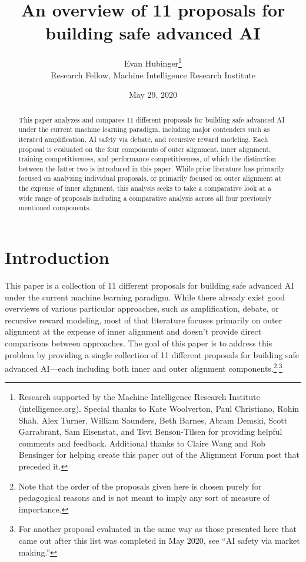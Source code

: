 \documentclass[
  onecolumn,
  natbib,
]{miri-tech-article}
\begin{document}
\title{An overview of 11 proposals for building safe advanced AI}
\author{Evan Hubinger\thanks{Research supported by the Machine Intelligence Research Institute (intelligence.org). Special thanks to Kate Woolverton, Paul Christiano, Rohin Shah, Alex Turner, William Saunders, Beth Barnes, Abram Demski, Scott Garrabrant, Sam Eisenstat, and Tsvi Benson-Tilsen for providing helpful comments and feedback. Additional thanks to Claire Wang and Rob Bensinger for helping create this paper out of the Alignment Forum post that preceded it.\cite{post}} \\ Research Fellow, Machine Intelligence Research Institute}

\date{May 29, 2020}

\maketitle

\begin{abstract}
This paper analyzes and compares 11 different proposals for building safe advanced AI under the current machine learning paradigm, including major contenders such as iterated amplification, AI safety via debate, and recursive reward modeling. Each proposal is evaluated on the four components of outer alignment, inner alignment, training competitiveness, and performance competitiveness, of which the distinction between the latter two is introduced in this paper. While prior literature has primarily focused on analyzing individual proposals, or primarily focused on outer alignment at the expense of inner alignment, this analysis seeks to take a comparative look at a wide range of proposals including a comparative analysis across all four previously mentioned components.
\end{abstract}

\tableofcontents

\section{Introduction}
\label{sec:0}

This paper is a collection of 11 different proposals for building safe advanced AI under the current machine learning paradigm. While there already exist good overviews of various particular approaches, such as amplification\cite{amplification}, debate\cite{debate}, or recursive reward modeling\cite{leike}, most of that literature focuses primarily on outer alignment at the expense of inner alignment\cite{risks} and doesn't provide direct comparisons between approaches. The goal of this paper is to address this problem by providing a single collection of 11 different proposals for building safe advanced AI---each including both inner and outer alignment components.\footnote{Note that the order of the proposals given here is chosen purely for pedagogical reasons and is not meant to imply any sort of measure of importance.}\textsuperscript{,}\footnote{For another proposal evaluated in the same way as those presented here that came out after this list was completed in May 2020, see ``AI safety via market making.''\cite{market_making}}
\end{document}
